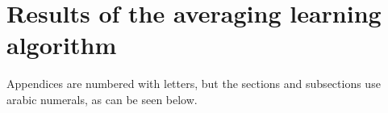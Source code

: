 \chapter{Results of the averaging learning algorithm}
\label{app:C}
Appendices are numbered with letters, but the sections and subsections use
arabic numerals, as can be seen below.

%
%


